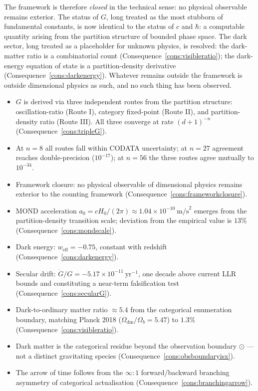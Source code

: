The framework is therefore \emph{closed} in the technical sense: no physical
observable remains exterior.
The status of $G$, long treated as the most stubborn of fundamental constants,
is now identical to the status of $c$ and $\hbar$: a computable quantity arising
from the partition structure of bounded phase space.
The dark sector, long treated as a placeholder for unknown physics, is resolved:
the dark-matter ratio is a combinatorial count (Consequence~\ref{cons:visibleratio});
the dark-energy equation of state is a partition-density derivative
(Consequence~\ref{cons:darkenergy}).
Whatever remains outside the framework is outside dimensional physics as such,
and no such thing has been observed.

\bigskip
\begin{tcolorbox}[colback=crownblue!5, colframe=crownblue!60!black,
                  title={\textbf{Chapter 20 Summary}}]
\begin{itemize}[noitemsep]
  \item $G$ is derived via three independent routes from the partition structure:
    oscillation-ratio (Route I), category fixed-point (Route II), and
    partition-density ratio (Route III).
    All three converge at rate $(d+1)^{-n}$
    (Consequence~\ref{cons:tripleG}).
  \item At $n = 8$ all routes fall within CODATA uncertainty; at $n = 27$
    agreement reaches double-precision ($10^{-17}$); at $n = 56$ the three
    routes agree mutually to $10^{-34}$.
  \item Framework closure: no physical observable of dimensional physics remains
    exterior to the counting framework
    (Consequence~\ref{cons:frameworkclosure}).
  \item MOND acceleration $a_{0} = cH_{0}/(2\pi) \approx 1.04\times10^{-10}~\mathrm{m/s}^{2}$
    emerges from the partition-density transition scale;
    deviation from the empirical value is $13\%$
    (Consequence~\ref{cons:mondscale}).
  \item Dark energy: $w_{\mathrm{eff}} = -0.75$, constant with redshift
    (Consequence~\ref{cons:darkenergy}).
  \item Secular drift: $\dot{G}/G = -5.17\times10^{-11}~\mathrm{yr}^{-1}$,
    one decade above current LLR bounds and constituting a near-term
    falsification test (Consequence~\ref{cons:secularG}).
  \item Dark-to-ordinary matter ratio $\approx 5.4$ from the categorical
    enumeration boundary, matching Planck 2018 ($\Omega_{\mathrm{dm}}/\Omega_{b}
    = 5.47$) to $1.3\%$ (Consequence~\ref{cons:visibleratio}).
  \item Dark matter is the categorical residue beyond the observation boundary
    $\odot$ --- not a distinct gravitating species
    (Consequence~\ref{cons:obsboundaryisx}).
  \item The arrow of time follows from the $\infty:1$ forward/backward branching
    asymmetry of categorical actualisation
    (Consequence~\ref{cons:branchingarrow}).
\end{itemize}
\end{tcolorbox}
